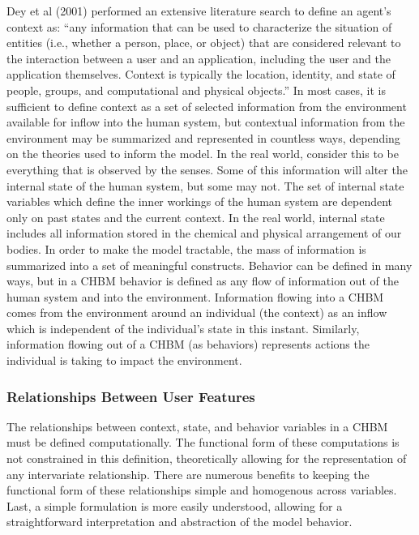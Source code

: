 \documentclass[runningheads,a4paper]{llncs}
\begin{document}
Dey et al (2001) performed an extensive literature search to define an agent's context as: ``any information that can be used to characterize the situation of entities (i.e., whether a person, place, or object) that are considered relevant to the interaction between a user and an application, including the user and the application themselves. Context is typically the location, identity, and state of people, groups, and computational and physical objects.''
In most cases, it is sufficient to define context as a set of selected information from the environment available for inflow into the human system, but contextual information from the environment may be summarized and represented in countless ways, depending on the theories used to inform the model.
In the real world, consider this to be everything that is observed by the senses. 
Some of this information will alter the internal state of the human system, but some may not. 
The set of internal state variables which define the inner workings of the human system are dependent only on past states and the current context. 
In the real world, internal state includes all information stored in the chemical and physical  arrangement of our bodies. 
In order to make the model tractable, the mass of information is summarized into a set of meaningful constructs.
Behavior can be defined in many ways, but in a CHBM behavior is defined as any flow of information out of the human system and into the environment.
Information flowing into a CHBM comes from the environment around an individual (the context) as an inflow which is independent of the individual's state in this instant.
Similarly, information flowing out of a CHBM (as behaviors) represents actions the individual is taking to impact the environment.

\subsubsection{Relationships Between User Features}
The relationships between context, state, and behavior variables in a CHBM must be defined computationally.
The functional form of these computations is not constrained in this definition, theoretically allowing for the representation of any intervariate relationship.
There are numerous benefits to keeping the functional form of these relationships simple and homogenous across variables.
Last, a simple formulation is more easily understood, allowing for a straightforward interpretation and abstraction of the model behavior.
\end{document}
